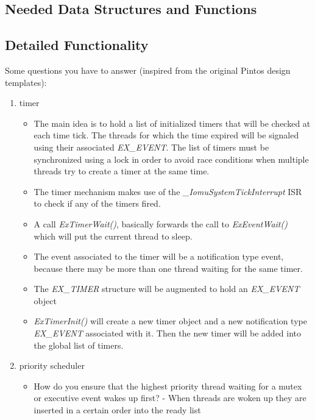 \subsection{Needed Data Structures and Functions}



\subsection{Detailed Functionality}

Some questions you have to answer (inspired from the original Pintos design templates):
\begin{enumerate}
    \item timer
        \begin{itemize}
            \item The main idea is to hold a list of initialized timers that will be checked at each time tick. The threads for which the time expired
            will be signaled using their associated \textit{EX_EVENT}. The list of timers must be synchronized using a lock in order to avoid race conditions
            when multiple threads try to create a timer at the same time.
            \item The timer mechanism makes use of the \textit{_IomuSystemTickInterrupt} ISR to check if any of the timers fired.
            \item A call \textit{ExTimerWait()}, basically forwards the call to \textit{ExEventWait()} which will put the current thread to sleep.
            \item The event associated to the timer will be a notification type event, because there may be more than one thread waiting for the same timer.

            \item The \textit{EX_TIMER} structure will be augmented to hold an \textit{EX_EVENT} object 
            \item \textit{ExTimerInit()} will create a new timer object and a new notification type \textit{EX_EVENT} associated with it. Then the new
            timer will be added into the global list of timers.
        \end{itemize}
    
    \item priority scheduler
        \begin{itemize}
            \item How do you ensure that the highest priority thread waiting for a mutex or executive event wakes up first?
                - When threads are woken up they are inserted in a certain order into the ready list
    

\end{itemize}
\end{enumerate}
